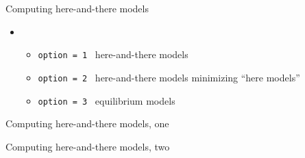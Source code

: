 \begin{frame}{Computing here-and-there models}
  \bigskip
  \begin{itemize}
  \item {}
    \begin{itemize}\normalsize
    \item \texttt{option = 1} \ here-and-there models
    \item \texttt{option = 2} \ here-and-there models minimizing ``here models''
    \item \texttt{option = 3} \ equilibrium models
    \end{itemize}
  \end{itemize}
\end{frame}
\begin{frame}[fragile]{Computing here-and-there models, one}
  \bigskip
  
\end{frame}
\begin{frame}[fragile,shrink=40]{Computing here-and-there models, two}
  \bigskip
  
\end{frame}
%
